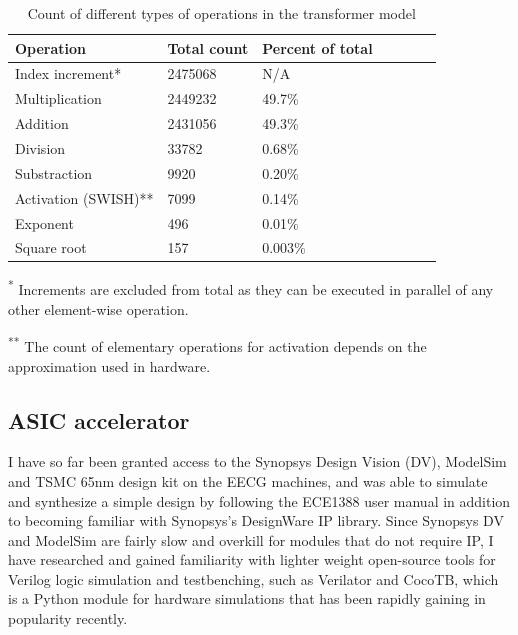 \documentclass[12pt, hidelinks]{article}
\begin{document}
    \begin{table}[ht]
        \centering
        \renewcommand{\arraystretch}{1.2} %
        \setlength{\arrayrulewidth}{1.5pt} %
        \caption{Count of different types of operations in the transformer model}
        \begin{tabular}{@{} *7l @{}}
            \toprule
            Operation            & Total count & Percent of total &&& \\\midrule
            Index increment*     & 2475068     & N/A     \\
            Multiplication       & 2449232     & 49.7\%  \\
            Addition             & 2431056     & 49.3\%  \\
            Division             & 33782       & 0.68\%  \\
            Substraction         & 9920        & 0.20\%  \\
            Activation (SWISH)** & 7099        & 0.14\%  \\
            Exponent             & 496         & 0.01\%  \\
            Square root          & 157         & 0.003\% \\
            \hline
        \end{tabular}
        \begin{minipage}{\textwidth}
            \footnotesize
            \textsuperscript{*} Increments are excluded from total as they can be executed in parallel of any other element-wise operation.

            \textsuperscript{**} The count of elementary operations for activation depends on the approximation used in hardware.
        \end{minipage}
        \label{tab:num_ops}
    \end{table}

    \subsection{ASIC accelerator}
    I have so far been granted access to the Synopsys Design Vision (DV), ModelSim and TSMC 65nm design kit on the EECG machines, and was able to simulate and synthesize a simple design by following the ECE1388 user manual in addition to becoming familiar
    with Synopsys's DesignWare IP library. Since Synopsys DV and ModelSim are fairly slow and overkill for modules that do not require IP, I have researched and gained familiarity with lighter weight open-source tools for Verilog logic simulation and
    testbenching, such as Verilator and CocoTB, which is a Python module for hardware simulations that has been rapidly gaining in popularity recently.
    
\end{document}
